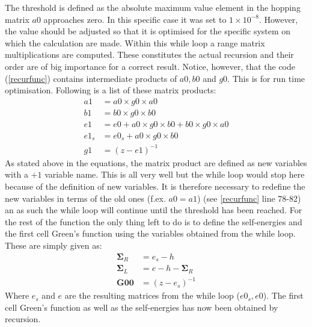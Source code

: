 The threshold is defined as the absolute maximum value element in the hopping matrix \(a0\) approaches zero. In this specific case it was set to \(1\times10^{-8} \). However, the value should be adjusted so that it is optimised for the specific system on which the calculation are made. Within this while loop a range matrix multiplications are computed. These constitutes the actual recursion and their order are of big importance for a correct result. Notice, however, that the code (\cref{recurfunc}) contains intermediate products of \(a0, b0\) and \(g0\). This is for run time optimisation. Following is a list of these matrix products:
\begin{align*}
	a1     & = a0 \times g0 \times a0                   \\
	b1     & = b0\times g0\times b0                   \\
	e1     & = e0 + a0\times g0\times b0 + b0\times g0\times a0 \\
	e1_{s} & = e0_{s} + a0\times g0\times b0          \\
	g1     & = (z - e1)^{-1}
\end{align*}
As stated above in the equations, the matrix product are defined as new variables with a \(+1\) variable name. This is all very well but the while loop would stop here because of the definition of new variables. It is therefore necessary to redefine the new variables in terms of the old ones (f.ex. \(a0 = a1\)) (see \cref{recurfunc} line 78-82) an as such the while loop will continue until the threshold has been reached. For the rest of the function the only thing left to do is to define the self-energies and the first cell Green's function using the variables obtained from the while loop. These are simply given as:
\begin{align}\label{outputs}
	\mathbf{\Sigma}_R & = e_s - h                   \\ \nonumber
	\mathbf{\Sigma}_L & = e - h - \mathbf{\Sigma}_R \\ \nonumber
	\mathbf{G00}      & = (z - e_s)^{-1}
\end{align}
Where \(e_s\) and \(e\) are the resulting matrices from the while loop (\(e0_s, e0\)). The first cell Green's function as well as the self-energies has now been obtained by recursion.
